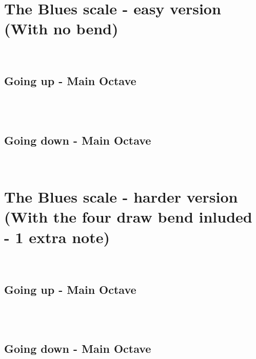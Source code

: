 \section{The Blues scale - easy version (With no bend)}\\
\subsection{Going up - Main Octave}\\
\2\3\four\4\5\six\\

\subsection{Going down - Main Octave}\\
\six\5\4\four\3\2

\vspace{4cm}
\hline
\vspace{3cm}

\section{The Blues scale - harder version (With the four draw bend inluded - 1 extra note)}\\
\subsection{Going up - Main Octave}\\
\2\3\four\e\4\5\six\\

\subsection{Going down - Main Octave}\\
\six\5\4\e\four\3\2

